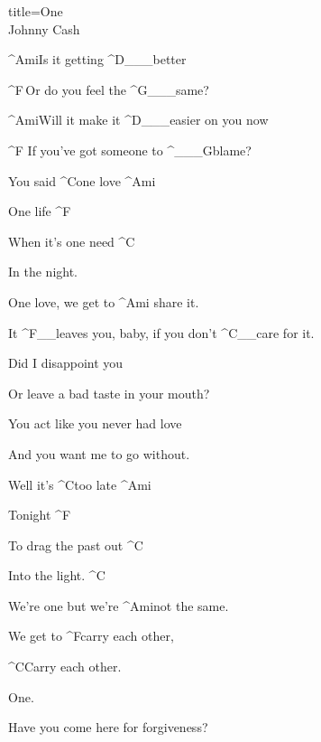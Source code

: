 \begin{song}{title=\predtitle\centering One \\\large Johnny Cash  \vspace*{-1.6cm}}  %
\begin{centerjustified}

\normalsize
\begin{varwidth}[t]{0.55\textwidth}\setlength{\parindent}{0.25cm} %

{\setlength{\parskip}{0pt}

\sloka 
 	^{\small Ami}Is it getting ^{\small D{\color{white}\_\_\_}}better

	^{\small F\,}Or do you feel the ^{\small G{\color{white}\_\_\_}}same?

	^{\small Ami}Will it make it ^{\small D{\color{white}\_\_\_}}easier on you now

	^{\small F\,\,}If you've got someone to ^{\small {\color{white}\_\_\_}G}blame?

   
	You said ^{\small C}one love ^{\small Ami}

	One life ^{\small F}

	When it's one need ^{\small C}
         
	In the night.
  
	One love, we get to ^{\small Ami\,\,}share it.

	It ^{\small F{\color{white}\_\_}}leaves you, baby, if you don't ^{\small C{\color{white}\_\_}}care for it.   


\sloka
	Did I disappoint you

	Or leave a bad taste in your mouth?

	You act like you never had love

	And you want me to go without.


	Well it's ^{\small C}too late ^{\small Ami}

	Tonight ^{\small F}

	To drag the past out ^{\small C}

	Into the light. ^{\small C}

	We're one but we're ^{\small Ami}not the same.

	We get to ^{\small F}carry each other,

	^{\small C}Carry each other.
 
	One.

\sloka    
	Have you come here for forgiveness?

}
\end{varwidth}
\end{centerjustified}
\end{song}
